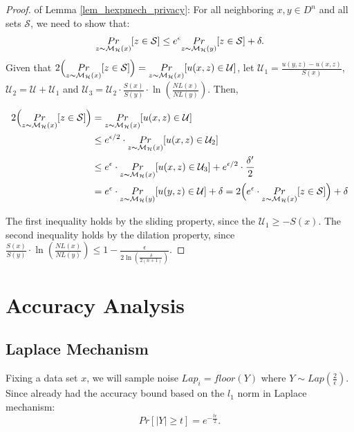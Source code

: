 \documentclass[sigconf]{acmart}
\begin{document}
\begin{proof}
of Lemma \ref{lem_hexpmech_privacy}: For all neighboring $x, y \in D^n$ and all sets $\mathcal{S}$, we need to show that:
\begin{equation*}
\underset{z \thicksim \mathcal{M}_{\mathcal{H}}(x)}{Pr}[ z \in \mathcal{S}] \leq e^{\epsilon} \underset{z \thicksim \mathcal{M}_{\mathcal{H}}(y)}{Pr}[z \in \mathcal{S}] + \delta. 
\end{equation*}
Given that $2\Big( \underset{z \thicksim \mathcal{M}_{\mathcal{H}}(x)}{Pr}[ z \in \mathcal{S}]\Big) = \underset{z \thicksim \mathcal{M}_{\mathcal{H}}(x)}{Pr}[ u(x,z) \in \mathcal{U}]$, let $\mathcal{U}_1 = \frac{u(y,z) - u(x,z)}{S(x)}$, $\mathcal{U}_2 = \mathcal{U} + \mathcal{U}_1$ and $\mathcal{U}_3 = \mathcal{U}_2 \cdot \frac{S(x)}{S(y)} \cdot \ln(\frac{NL(x)}{NL(y)})$. Then,

\begin{equation*}
\begin{split}
2\Big( \underset{z \thicksim \mathcal{M}_{\mathcal{H}}(x)}{Pr}[ z \in \mathcal{S}]\Big)
& = \underset{z \thicksim \mathcal{M}_{\mathcal{H}}(x)}{Pr}[ u(x,z) \in \mathcal{U}]\\
& \leq e^{\epsilon / 2} \cdot \underset{z \thicksim \mathcal{M}_{\mathcal{H}}(x)}{Pr}[ u(x,z) \in \mathcal{U}_2]\\
& \leq e^{\epsilon} \cdot \underset{z \thicksim \mathcal{M}_{\mathcal{H}}(x)}{Pr}[ u(x,z) \in \mathcal{U}_3] + e^{\epsilon/2} \cdot \frac{\delta'}{2}\\
& = e^{\epsilon} \cdot \underset{z \thicksim \mathcal{M}_{\mathcal{H}}(y)}{Pr}[ u(y,z) \in \mathcal{U}] + \delta = 2\Big( e^{\epsilon} \cdot \underset{z \thicksim \mathcal{M}_{\mathcal{H}}(x)}{Pr}[ z \in \mathcal{S}] \Big) + \delta\\
\end{split}
\end{equation*}

The first inequality holds by the sliding property, since the $\mathcal{U}_1 \geq -S(x)$. The second inequality holds by the dilation property, since $\frac{S(x)}{S(y)} \cdot \ln(\frac{NL(x)}{NL(y)}) \leq 1 - \frac{\epsilon}{2 \ln (\frac{\delta}{2 (n + 1)})}$.

\end{proof}

\section{Accuracy Analysis}
\subsection{Laplace Mechanism}
\label{subsec_accuracy_lap}
Fixing a data set $x$, we will sample noise $Lap_i = floor(Y)$ where $Y \sim Lap(\frac{2}{\epsilon})$. Since already had the accuracy bound based on the $l_1$ norm in Laplace mechanism:
\begin{equation*}
Pr[|Y| \geq t] = e^{- \frac{t \epsilon}{2}}.
\end{equation*}
\end{document}
